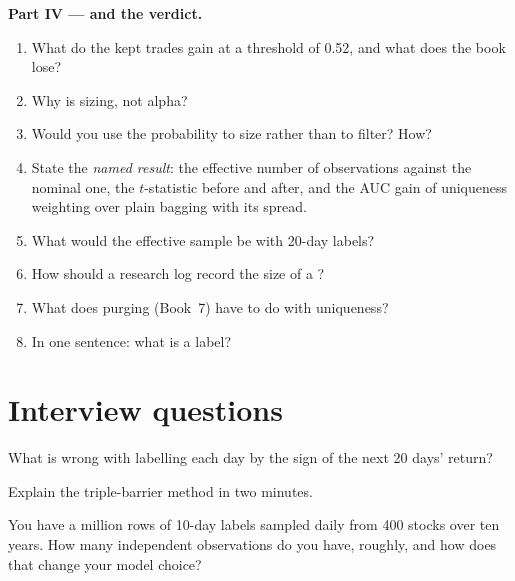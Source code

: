 \begin{problem}
\medskip\noindent\textbf{Part IV ---  and the verdict.}
\begin{enumerate}[resume]
\item What do the kept trades gain at a threshold of 0.52, and what does the book lose?
\item Why is  sizing, not alpha?
\item Would you use the probability to size rather than to filter? How?
\item State the \emph{named result}: the effective number of observations against the nominal one, the $t$-statistic
before and after, and the AUC gain of uniqueness weighting over plain bagging with its spread.
\item What would the effective sample be with 20-day labels?
\item How should a research log record the size of a ?
\item What does purging (Book~7) have to do with uniqueness?
\item In one sentence: what is a label?
\end{enumerate}
\end{problem}

\section{Interview questions}

\begin{interviewq}\label{iq:ml:targets-labels-and-sample-weights:1}
What is wrong with labelling each day by the sign of the next 20 days' return?
\end{interviewq}

\begin{interviewq}\label{iq:ml:targets-labels-and-sample-weights:2}
Explain the triple-barrier method in two minutes.
\end{interviewq}

\begin{interviewq}\label{iq:ml:targets-labels-and-sample-weights:3}
You have a million rows of 10-day labels sampled daily from 400 stocks over ten years. How many independent observations
do you have, roughly, and how does that change your model choice?
\end{interviewq}

